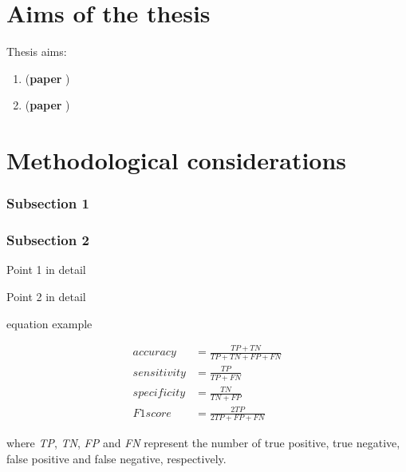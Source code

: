 \documentclass[]{uiophd}
\begin{document}
\chapter{Aims of the thesis}

\lipsum[20] %

Thesis aims:
\begin{enumerate}
	\item \lipsum[1] (\textbf{paper })
	 
	\item \lipsum[2] (\textbf{paper })
	
\end{enumerate}


\chapter{Methodological considerations}

\subsection*{Subsection 1} 
\lipsum[29]



\subsection*{Subsection 2} 

\begin{description}[align=left,noitemsep, topsep=3pt]
	
	\item [Point 1] Point 1 in detail
	\item [Point 2] Point 2 in detail

\end{description}
\smallskip

equation example 

\begin{align*}
accuracy &= \frac{TP+TN}{TP+TN+FP+FN}\\
sensitivity &= \frac{TP}{TP+FN}\\
specificity &= \frac{TN}{TN+FP}\\
F1 score &= \frac{2TP}{2TP+FP+FN}
\end{align*}

\noindent
where \textit{TP}, \textit{TN}, \textit{FP} and \textit{FN} represent the number of true positive, true negative, false positive and false negative, respectively.
\end{document}
